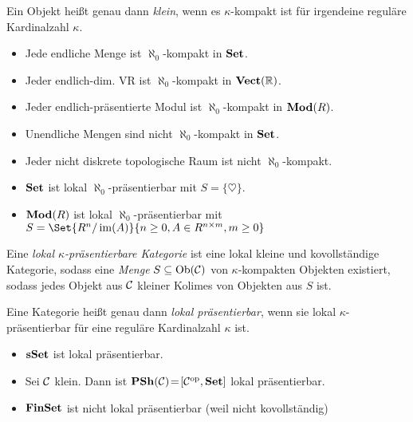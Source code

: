 \documentclass{cheat-sheet}
\begin{document}
\begin{defn}
  Ein Objekt heißt genau dann \emph{klein}, wenn es $\kappa$-kompakt ist für irgendeine reguläre Kardinalzahl $\kappa$.
\end{defn}

\iffalse
\begin{idee}
  Sei $X$ eine endliche Menge. Sei $X \subset \cup_{i \in \N} T_i$, $T_i \subseteq T_{i+1}$. Dann liegt $X$ schon vollständig in einem der $T_i$.
\end{idee}
\fi

\begin{bspe}
  \begin{itemize}
    \item Jede endliche Menge ist $\aleph_0$-kompakt in $\mathbf{Set}$.
    \item Jeder endlich-dim. VR ist $\aleph_0$-kompakt in $\mathbf{Vect}(\mathbb{R})$.
    \item Jeder endlich-präsentierte Modul ist $\aleph_0$-kompakt in $\mathbf{Mod}(R)$.
    \item Unendliche Mengen sind nicht $\aleph_0$-kompakt in $\mathbf{Set}$.
    \item Jeder nicht diskrete topologische Raum ist nicht $\aleph_0$-kompakt.
    \item $\mathbf{Set}$ ist lokal $\aleph_0$-präsentierbar mit $S = \{ \heartsuit \}$.
    \item $\mathbf{Mod}(R)$ ist lokal $\aleph_0$-präsentierbar mit $S = \Set{R^n/\im(A)}{n \geq 0, A \in R^{n \times m}, m \geq 0}$
  \end{itemize}
\end{bspe}

\begin{defn}
  Eine \emph{lokal $\kappa$-präsentierbare Kategorie} ist eine lokal kleine und kovollständige Kategorie, sodass eine {\em Menge} $S \subseteq \operatorname{Ob}(\mathcal{C})$ von $\kappa$-kompakten Objekten existiert, sodass jedes Objekt aus $\mathcal{C}$ kleiner Kolimes von Objekten aus $S$ ist.
\end{defn}


\begin{defn}
  Eine Kategorie heißt genau dann \emph{lokal präsentierbar}, wenn sie lokal $\kappa$-präsentierbar für eine reguläre Kardinalzahl $\kappa$ ist.
\end{defn}

\begin{bspe}
  \begin{itemize}
    \item $\mathbf{sSet}$ ist lokal präsentierbar.
    \item Sei $\mathcal{C}$ klein. Dann ist $\mathbf{PSh}(\mathcal{C}) \!=\! [\mathcal{C}^{\mathrm{op}}, \mathbf{Set}]$ lokal präsentierbar.
    \item $\mathbf{FinSet}$ ist nicht lokal präsentierbar (weil nicht kovollständig)
  \end{itemize}
\end{bspe}
\end{document}
